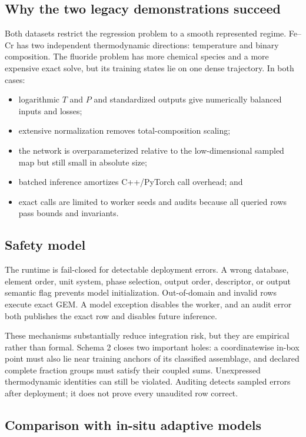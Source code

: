 \documentclass[11pt]{article}
\begin{document}
\subsection{Why the two legacy demonstrations succeed}

Both datasets restrict the regression problem to a smooth represented regime.  Fe--Cr has two
independent thermodynamic directions: temperature and binary composition.  The fluoride problem
has more chemical species and a more expensive exact solve, but its training states lie on one
dense trajectory.  In both cases:
\begin{itemize}[leftmargin=*]
  \item logarithmic \(T\) and \(P\) and standardized outputs give numerically balanced inputs and
  losses;
  \item extensive normalization removes total-composition scaling;
  \item the network is overparameterized relative to the low-dimensional sampled map but still
  small in absolute size;
  \item batched inference amortizes C++/PyTorch call overhead; and
  \item exact calls are limited to worker seeds and audits because all queried rows pass bounds and
  invariants.
\end{itemize}

\subsection{Safety model}

The runtime is fail-closed for detectable deployment errors.  A wrong database, element order,
unit system, phase selection, output order, descriptor, or output semantic flag prevents model
initialization.  Out-of-domain and invalid rows execute exact GEM.  A model exception disables the
worker, and an audit error both publishes the exact row and disables future inference.

These mechanisms substantially reduce integration risk, but they are empirical rather than
formal.  Schema 2 closes two important holes: a coordinatewise in-box point must also lie near
training anchors of its classified assemblage, and declared complete fraction groups must satisfy
their coupled sums.  Unexpressed thermodynamic identities can still be violated.  Auditing detects
sampled errors after deployment; it does not prove every unaudited row correct.

\subsection{Comparison with in-situ adaptive models}
\end{document}
